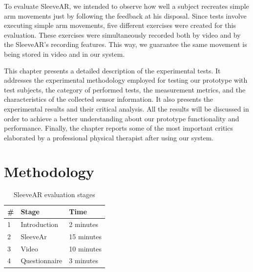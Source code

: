 To evaluate SleeveAR, we intended to observe how well a subject recreates simple arm movements just by following the feedback at his disposal. 
Since tests involve executing simple arm movements, five different exercises were created for this evaluation. These exercises were simultaneously recorded both by video and by the SleeveAR's recording features. This way, we guarantee the same movement is being stored in video and in our system.

This chapter presents a detailed description of the experimental tests. It addresses the experimental methodology employed for testing our prototype with test subjects, the category of performed tests, the measurement metrics, and the characteristics of the collected sensor information. It also presents the experimental results and their critical analysis. All the results will be discussed in order to achieve a better understanding about our prototype functionality and performance.
Finally, the chapter reports some of the most important critics elaborated by a professional physical therapist after using our system.

\section{Methodology} \label{evaluation-methodology}

\begin{table}
\centering
\begin{tabular}{lll}
\hline
\multicolumn{1}{|l|}{\#}& \multicolumn{1}{l|}{Stage}         & \multicolumn{1}{l|}{Time}       \\ \hline
\multicolumn{1}{|l|}{1} & \multicolumn{1}{l|}{Introduction}  & \multicolumn{1}{l|}{2 minutes}  \\ \hline
\multicolumn{1}{|l|}{2} & \multicolumn{1}{l|}{SleeveAr}      & \multicolumn{1}{l|}{15 minutes} \\ \hline
\multicolumn{1}{|l|}{3} & \multicolumn{1}{l|}{Video}         & \multicolumn{1}{l|}{10 minutes} \\ \hline
\multicolumn{1}{|l|}{4} & \multicolumn{1}{l|}{Questionnaire} & \multicolumn{1}{l|}{3 minutes}  \\ \hline
\end{tabular}
\caption{SleeveAR evaluation stages}
\label{table:teststages}
\end{table}


